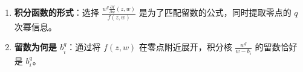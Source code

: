 \documentclass[lang=cn,zihao=-4,fontset=none,twoside]{fancybook}
\begin{document}
\begin{enumerate}
\def\labelenumi{\arabic{enumi}.}
\item
  \textbf{积分函数的形式}：选择
  \(\frac{w^q \frac{\partial f}{\partial w}(z, w)}{f(z, w)}\)
  是为了匹配留数的公式，同时提取零点的 \(q\) 次幂信息。
\item
  \textbf{留数为何是 \(b_i^q\)}：通过将 \(f(z, w)\)
  在零点附近展开，积分核 \(\frac{w^q}{w - b_i}\) 的留数恰好是
  \(b_i^q\)。
\end{enumerate}



  

  









\normalem

\ISBNcode{\EANisbn[ISBN=978-80-7340-097-2]} %
\makebottomcover
\end{document}
